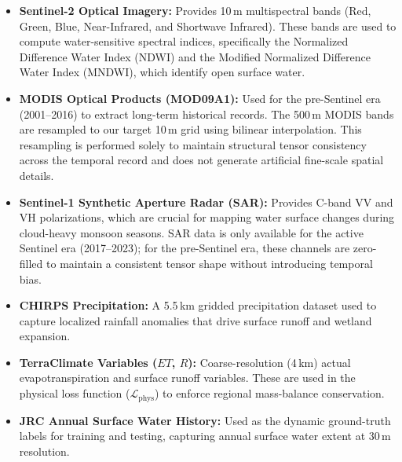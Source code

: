 \documentclass[preprint,12pt]{elsarticle}
\begin{document}
\begin{itemize}
    \item \textbf{Sentinel-2 Optical Imagery:} Provides 10\,m multispectral bands (Red, Green, Blue, Near-Infrared, and Shortwave Infrared). These bands are used to compute water-sensitive spectral indices, specifically the Normalized Difference Water Index (NDWI) and the Modified Normalized Difference Water Index (MNDWI), which identify open surface water.
    \item \textbf{MODIS Optical Products (MOD09A1):} Used for the pre-Sentinel era (2001--2016) to extract long-term historical records. The 500\,m MODIS bands are resampled to our target 10\,m grid using bilinear interpolation. This resampling is performed solely to maintain structural tensor consistency across the temporal record and does not generate artificial fine-scale spatial details.
    \item \textbf{Sentinel-1 Synthetic Aperture Radar (SAR):} Provides C-band VV and VH polarizations, which are crucial for mapping water surface changes during cloud-heavy monsoon seasons. SAR data is only available for the active Sentinel era (2017--2023); for the pre-Sentinel era, these channels are zero-filled to maintain a consistent tensor shape without introducing temporal bias.
    \item \textbf{CHIRPS Precipitation:} A 5.5\,km gridded precipitation dataset used to capture localized rainfall anomalies that drive surface runoff and wetland expansion.
    \item \textbf{TerraClimate Variables ($ET$, $R$):} Coarse-resolution (4\,km) actual evapotranspiration and surface runoff variables. These are used in the physical loss function ($\mathcal{L}_{\text{phys}}$) to enforce regional mass-balance conservation.
    \item \textbf{JRC Annual Surface Water History:} Used as the dynamic ground-truth labels for training and testing, capturing annual surface water extent at 30\,m resolution.
\end{itemize}
\end{document}
